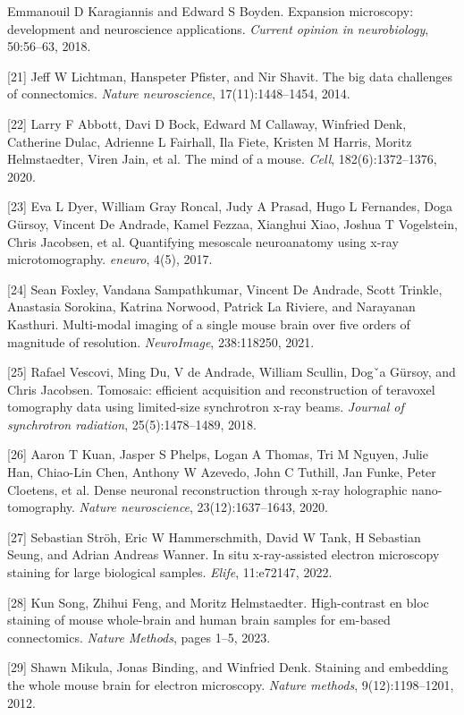 \documentclass{article}
\begin{document}
\begin{hangpars}
[20] Emmanouil D Karagiannis and Edward S Boyden. Expansion microscopy: development and neuroscience applications. \emph{Current opinion in neurobiology}, 50:56–63, 2018.

[21] Jeff W Lichtman, Hanspeter Pfister, and Nir Shavit. The big data challenges of connectomics. \emph{Nature neuroscience}, 17(11):1448–1454, 2014.

[22] Larry F Abbott, Davi D Bock, Edward M Callaway, Winfried Denk, Catherine Dulac, Adrienne L Fairhall, Ila Fiete, Kristen M Harris, Moritz Helmstaedter, Viren Jain, et al. The mind of a mouse. \emph{Cell}, 182(6):1372–1376, 2020.

[23] Eva L Dyer, William Gray Roncal, Judy A Prasad, Hugo L Fernandes, Doga Gürsoy, Vincent De Andrade, Kamel Fezzaa, Xianghui Xiao, Joshua T Vogelstein, Chris Jacobsen, et al. Quantifying mesoscale neuroanatomy using x-ray microtomography. \emph{eneuro}, 4(5), 2017.

[24] Sean Foxley, Vandana Sampathkumar, Vincent De Andrade, Scott Trinkle, Anastasia Sorokina, Katrina Norwood, Patrick La Riviere, and Narayanan Kasthuri. Multi-modal imaging of a single mouse brain over five orders of magnitude of resolution. \emph{NeuroImage}, 238:118250, 2021.

[25] Rafael Vescovi, Ming Du, V de Andrade, William Scullin, Dogˇa Gürsoy, and Chris Jacobsen. Tomosaic: efficient acquisition and reconstruction of teravoxel tomography data using limited-size synchrotron x-ray beams. \emph{Journal of synchrotron radiation}, 25(5):1478–1489, 2018.

[26] Aaron T Kuan, Jasper S Phelps, Logan A Thomas, Tri M Nguyen, Julie Han, Chiao-Lin Chen, Anthony W Azevedo, John C Tuthill, Jan Funke, Peter Cloetens, et al. Dense neuronal reconstruction through x-ray holographic nano-tomography. \emph{Nature neuroscience}, 23(12):1637–1643, 2020.

[27] Sebastian Ströh, Eric W Hammerschmith, David W Tank, H Sebastian Seung, and Adrian Andreas Wanner. In situ x-ray-assisted electron microscopy staining for large biological samples. \emph{Elife}, 11:e72147, 2022.

[28] Kun Song, Zhihui Feng, and Moritz Helmstaedter. High-contrast en bloc staining of mouse whole-brain and human brain samples for em-based connectomics. \emph{Nature Methods}, pages 1–5, 2023.

[29] Shawn Mikula, Jonas Binding, and Winfried Denk. Staining and embedding the whole mouse brain for electron microscopy. \emph{Nature methods}, 9(12):1198–1201, 2012.


\end{hangpars}
\end{document}
